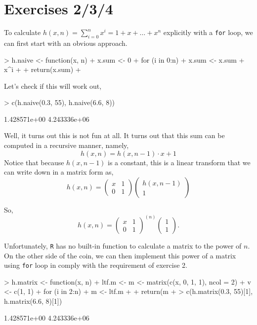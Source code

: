 \documentclass{article}
\begin{document}
\section{Exercises 2/3/4}
To calculate $h(x, n) = \sum_{i=0}^n x^i = 1 + x + \dots + x^n$ explicitly with a \verb=for= loop, we can first start with an obvious approach.
\begin{Schunk}
\begin{Sinput}
> h.naive <- function(x, n) {
+     x.sum <- 0
+     for (i in 0:n) {
+         x.sum <- x.sum + x^i
+     }
+     return(x.sum)
+ }
\end{Sinput}
\end{Schunk}
Let's check if this will work out,
\begin{Schunk}
\begin{Sinput}
> c(h.naive(0.3, 55), h.naive(6.6, 8))
\end{Sinput}
\begin{Soutput}
[1] 1.428571e+00 4.243336e+06
\end{Soutput}
\end{Schunk}
Well, it turns out this is not fun at all. It turns out that this sum can be computed in a recursive manner, namely, 
\[
h(x, n) = h(x, n-1)\cdot x + 1
\]
Notice that because $h(x, n-1)$ is a constant, this is a linear transform that we can write down in a matrix form as,
\[
h(x, n) = \left(
    \begin{array}{cc}
        x & 1 \\
        0 & 1
    \end{array}
    \right)
    \left (
    \begin{array}{c}
        h(x, n-1) \\
        1
    \end{array}
    \right )
\]

So,
\[
h(x, n) = \left(
    \begin{array}{cc}
        x & 1 \\
        0 & 1
    \end{array}
    \right)^{(n)}
    \left(
    \begin{array}{c}
        1 \\
        1
    \end{array}
    \right).
\]

Unfortunately, \verb=R= has no built-in function to calculate a matrix to the power of $n$. On the other side of the coin, we can then implement this power of a matrix using \verb=for= loop in comply with the requirement of exercise 2.
\begin{Schunk}
\begin{Sinput}
> h.matrix <- function(x, n) {
+     ltf.m <- m <- matrix(c(x, 0, 1, 1), ncol = 2)
+     v <- c(1, 1)
+     for (i in 2:n) {
+         m <- ltf.m %*% m
+     }
+     return(m %*% v)
+ }
> c(h.matrix(0.3, 55)[1], h.matrix(6.6, 8)[1])
\end{Sinput}
\begin{Soutput}
[1] 1.428571e+00 4.243336e+06
\end{Soutput}
\end{Schunk}
\end{document}

